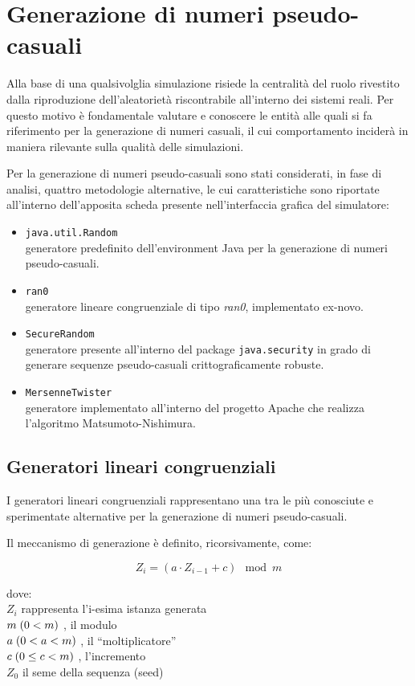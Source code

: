 \chapter{Generazione di numeri pseudo-casuali}
\label{ch:rnd}

Alla base di una qualsivolglia simulazione risiede la centralit\`a del ruolo rivestito dalla riproduzione dell'aleatoriet\`a riscontrabile all'interno dei sistemi reali. Per questo motivo \`e fondamentale valutare e conoscere le entit\`a alle quali si fa riferimento per la generazione di numeri casuali, il cui comportamento incider\`a in maniera rilevante sulla qualit\`a delle simulazioni.

Per la generazione di numeri pseudo-casuali sono stati considerati, in fase di analisi, quattro metodologie alternative, le cui caratteristiche sono riportate all'interno dell'apposita scheda presente nell'interfaccia grafica del simulatore:
\begin{itemize}
\item {\tt java.util.Random}\\
	generatore predefinito dell'environment Java per la generazione di numeri pseudo-casuali.
\item {\tt ran0}\\
	generatore lineare congruenziale di tipo \emph{ran0}, implementato ex-novo.
\item {\tt SecureRandom}\\
	generatore presente all'interno del package {\tt java.security} in grado di generare sequenze pseudo-casuali crittograficamente robuste.
\item {\tt MersenneTwister}\\
	generatore implementato all'interno del progetto Apache che realizza l'algoritmo Matsumoto-Nishimura.
\end{itemize}


\section{Generatori lineari congruenziali}

I generatori lineari congruenziali rappresentano una tra le pi\`u conosciute e sperimentate alternative per la generazione di numeri pseudo-casuali. 

Il meccanismo di generazione \`e definito, ricorsivamente, come:

$$
Z_{i}=(a \cdot Z_{i-1}+c)\mod m
$$

dove:\\
$Z_{i}$ rappresenta l'i-esima istanza generata\\
$m \thickspace(0<m)$		, il modulo\\
$a \thickspace(0<a<m)$		, il ``moltiplicatore''\\
$c \thickspace(0\le c<m)$	, l'incremento\\
$Z_{0}$ il seme della sequenza (seed)\\

